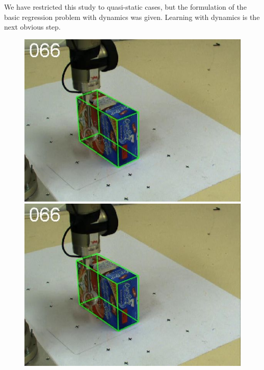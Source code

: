  We have restricted this study to quasi-static cases, but the formulation of the basic regression problem with dynamics was given. Learning with dynamics is the next obvious step.

\newlength{\imgCXwid}
\setlength{\imgCXwid}{2.15cm}
\begin{figure}[tbp]
\centerline{
\includegraphics[width=\imgCXwid]{images/C1_2exp_87_1}
\includegraphics[width=\imgCXwid]{images/C1_1exp_87_1}
}
\end{figure}
